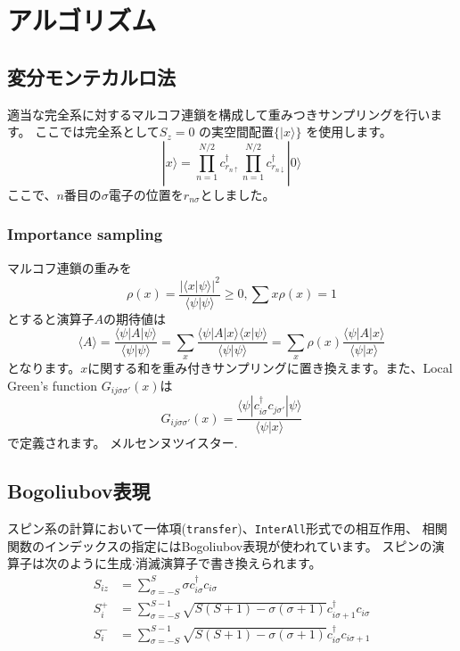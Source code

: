 \chapter{アルゴリズム}
\label{Ch:algorithm}
\section{変分モンテカルロ法}
適当な完全系に対するマルコフ連鎖を構成して重みつきサンプリングを行います。
ここでは完全系として$S_z = 0$ の実空間配置$\{| x\rangle\}$ を使用します。
\begin{equation}
| x\rangle =  \prod_{n=1}^{N/2} c_{r_{n\uparrow}}^{\dag} \prod_{n=1}^{N/2} c_{r_{n\downarrow}}^{\dag} |0 \rangle
\end{equation}
ここで、$n$番目の$\sigma$電子の位置を$r_{n\sigma}$としました。
\subsection{Importance sampling}
マルコフ連鎖の重みを
\begin{equation}
\rho(x)=\frac{|\langle x| \psi \rangle|^2}{\langle \psi | \psi \rangle} \ge 0, \sum{x} \rho(x)=1
\end{equation}
とすると演算子$A$の期待値は
\begin{equation}
\langle A \rangle =\frac{\langle \psi| A| \psi \rangle}{\langle \psi | \psi \rangle} 
=\sum_x \frac{\langle \psi| A | x\rangle \langle x| \psi \rangle}{\langle \psi |\psi \rangle} 
=\sum_x \rho(x) \frac{\langle \psi| A | x\rangle }{\langle \psi |x \rangle} 
\end{equation}
となります。$x$に関する和を重み付きサンプリングに置き換えます。また、Local Green's function $G_{ij\sigma\sigma'}(x)$は
\begin{equation}
G_{ij\sigma\sigma'}(x)=\frac{\langle \psi | c_{i\sigma}^{\dag} c_{j\sigma'} | \psi \rangle}{\langle \psi | x \rangle}
\end{equation}
で定義されます。
メルセンヌツイスター\cite{Mutsuo2008}.

\section{Bogoliubov表現}\label{sec_bogoliubov_rep}

スピン系の計算において一体項(\verb|transfer|)、\verb|InterAll|形式での相互作用、
相関関数のインデックスの指定にはBogoliubov表現が使われています。
スピンの演算子は次のように生成$\cdot$消滅演算子で書き換えられます。
\begin{align}
  S_{i z} &= \sum_{\sigma = -S}^{S} \sigma c_{i \sigma}^\dagger c_{i \sigma}
  \\
  S_{i}^+ &= \sum_{\sigma = -S}^{S-1} 
  \sqrt{S(S+1) - \sigma(\sigma+1)} 
  c_{i \sigma+1}^\dagger c_{i \sigma}
  \\
  S_{i}^- &= \sum_{\sigma = -S}^{S-1} 
  \sqrt{S(S+1) - \sigma(\sigma+1)} 
  c_{i \sigma}^\dagger c_{i \sigma+1}
\end{align}

